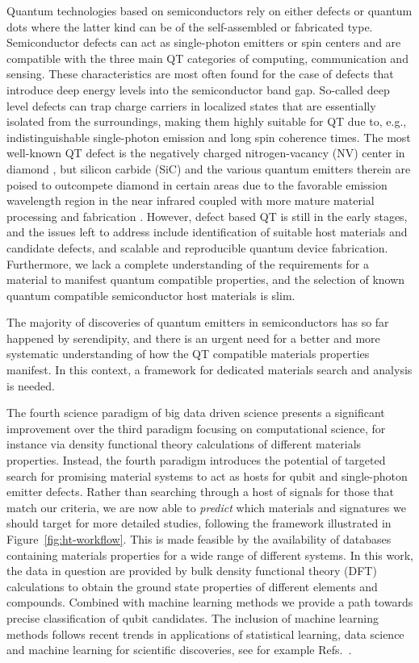 \documentclass[superscriptaddress,unsortedaddress,
 amsmath,amssymb,
 aps,
]{revtex4-2}
\begin{document}
Quantum technologies based on semiconductors rely on either defects or quantum dots where the latter kind can be of the self-assembled or fabricated type. 
Semiconductor defects can act as single-photon emitters or spin centers and are compatible with the three main QT categories of computing, communication and sensing.  
These characteristics are most often found for the case of defects that introduce deep energy levels into the semiconductor band gap. So-called deep level defects can trap charge carriers in localized states that are essentially isolated from the surroundings, making them highly suitable for QT due to, e.g., indistinguishable single-photon emission and long spin coherence times. 
The most well-known QT defect is the negatively charged nitrogen-vacancy (NV) center in diamond \cite{Doherty_2013}, but silicon carbide (SiC) and the various quantum emitters therein are poised to outcompete diamond in certain areas due to the favorable emission wavelength region in the near infrared coupled with more mature material processing and fabrication \cite{Bathen2021}. 
However, defect based QT is still in the early stages, and the issues left to address include identification of suitable host materials and candidate defects, and scalable and reproducible quantum device fabrication. 
Furthermore, we lack a complete understanding of the requirements for a material to manifest quantum compatible properties,  
and the selection of known quantum compatible semiconductor host materials is slim. 

The majority of discoveries of quantum emitters in semiconductors has so far happened by serendipity, and there is an urgent need for a better and more systematic understanding of how the QT compatible materials properties manifest. In this context, a framework for dedicated materials search and analysis is needed. 

The fourth science paradigm of big data driven science presents a significant improvement over the third paradigm focusing on computational science, for instance via density functional theory calculations of different materials properties. Instead, the fourth paradigm  introduces the potential of targeted search for promising material systems to act as hosts for qubit and single-photon emitter defects.  
Rather than searching through a host of signals for those that match our criteria, we are now able to \textit{predict} which materials and signatures we should target for more detailed studies, following the framework illustrated in Figure~\ref{fig:ht-workflow}. 
This is made feasible by the availability of databases containing materials properties for a wide range of different systems. In this work, the data in question are provided by bulk density functional theory (DFT) calculations to obtain the ground state properties of different elements and compounds. Combined with machine learning methods we provide a path towards precise classification of qubit candidates. The inclusion of machine learning methods follows recent trends in applications of statistical learning, data science and machine learning for scientific discoveries, see for example Refs.~\cite{deiana2021,Carleo2019}.
\end{document}
